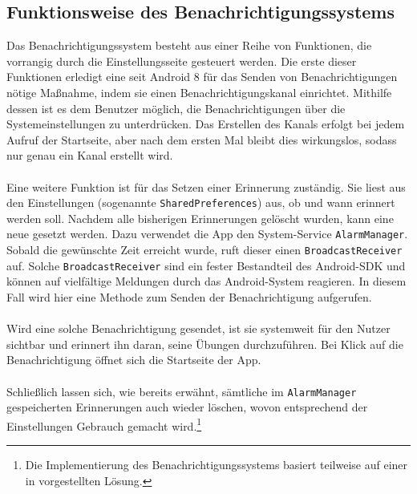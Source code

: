 \subsection{Funktionsweise des Benachrichtigungssystems}
Das Benachrichtigungssystem besteht aus einer Reihe von Funktionen, die vorrangig durch die Einstellungsseite gesteuert werden. Die erste dieser Funktionen erledigt eine seit Android 8 für das Senden von Benachrichtigungen nötige Maßnahme, indem sie einen Benachrichtigungskanal einrichtet. Mithilfe dessen ist es dem Benutzer möglich, die Benachrichtigungen über die Systemeinstellungen zu unterdrücken.\cite{Src:AndroidNotify} Das Erstellen des Kanals erfolgt bei jedem Aufruf der Startseite, aber nach dem ersten Mal bleibt dies wirkungslos, sodass nur genau ein Kanal erstellt wird. \\ \\
Eine weitere Funktion ist für das Setzen einer Erinnerung zuständig. Sie liest aus den Einstellungen (sogenannte \texttt{SharedPreferences}) aus, ob und wann erinnert werden soll. Nachdem alle bisherigen Erinnerungen gelöscht wurden, kann eine neue gesetzt werden. Dazu verwendet die App den System-Service \texttt{AlarmManager}\cite{Src:NotifyDroid}. Sobald die gewünschte Zeit erreicht wurde, ruft dieser einen \texttt{BroadcastReceiver} auf. Solche \texttt{BroadcastReceiver} sind ein fester Bestandteil des Android-SDK und können auf vielfältige Meldungen durch das Android-System reagieren.\cite{Src:AndroidKuenneth} In diesem Fall wird hier eine Methode zum Senden der Benachrichtigung aufgerufen. \\ \\
Wird eine solche Benachrichtigung gesendet, ist sie systemweit für den Nutzer sichtbar und erinnert ihn daran, seine Übungen durchzuführen. Bei Klick auf die Benachrichtigung öffnet sich die Startseite der App. \\ \\
Schließlich lassen sich, wie bereits erwähnt, sämtliche im \texttt{AlarmManager} gespeicherten Erinnerungen auch wieder löschen, wovon entsprechend der Einstellungen Gebrauch gemacht wird.\footnote[3]{Die Implementierung des Benachrichtigungssystems basiert teilweise auf einer in  \cite{Src:NotifyDroid} vorgestellten Lösung.}